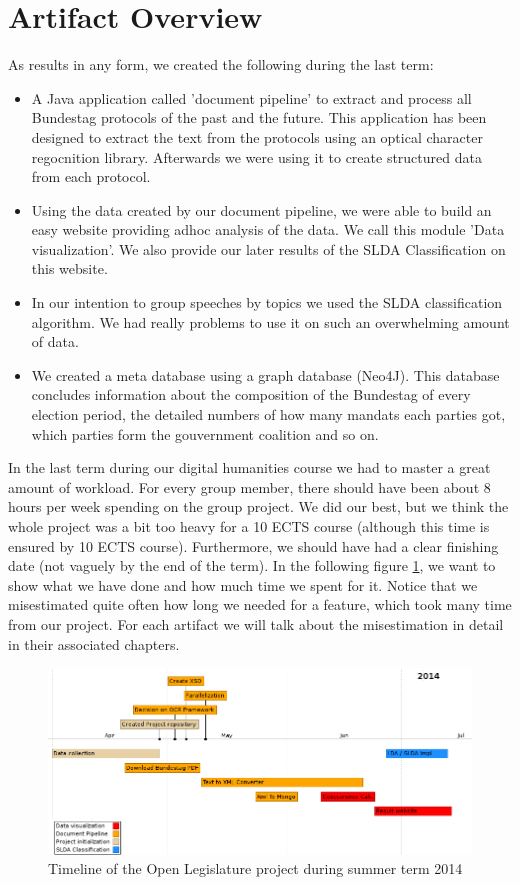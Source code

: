 \documentclass[12pt,paper=a4,nenglish]{scrreprt}
\begin{document}
\section{Artifact Overview}
\label{sec:artifact_overview}
As results in any form, we created the following during the last term:
\begin{itemize}
  \item A Java application called 'document pipeline' to extract and process
  all Bundestag protocols of the past and the future. 
  This application has been designed to extract the text from the protocols
  using an optical character regocnition library. Afterwards we were using it
  to create structured data from each protocol.
  \item Using the data created by our document pipeline, we were able to
  build an easy website providing adhoc analysis of the data. We call this
  module 'Data visualization'. We also provide our later results of the SLDA
  Classification on this
  website.%
  \item In our intention to group speeches by topics we used the SLDA
  classification algorithm. We had really problems to use it on such an
  overwhelming amount of data. 
  \item We created a meta database using a graph database (Neo4J). This
  database concludes information about the composition of the Bundestag of
  every election period, the detailed numbers of how many mandats each parties
  got, which parties form the gouvernment coalition and so on. 
\end{itemize}
In the last term during our digital humanities course we had to master a great
amount of workload. For every group member, there should have been about 8 hours
per week spending on the group project. We did our best, but we think the whole
project was a bit too heavy for a 10 ECTS course (although this time is ensured
by 10 ECTS course). 
Furthermore, we should have had a clear finishing
date (not vaguely by the end of the term). In the following figure
\ref{pic:timeline}, we want to show what we have done and how much time we spent
for it. Notice that we misestimated quite often how long we needed for a
feature, which took many time from our project. For each artifact we will talk about the misestimation in
detail in their associated chapters.
\begin{figure}[H] 
	\centering
	\includegraphics[scale=0.7]{res/timeline_term.png}
	\caption{Timeline of the Open Legislature project during summer term 2014}%
	\label{pic:timeline}%
\end{figure}%
\end{document}
